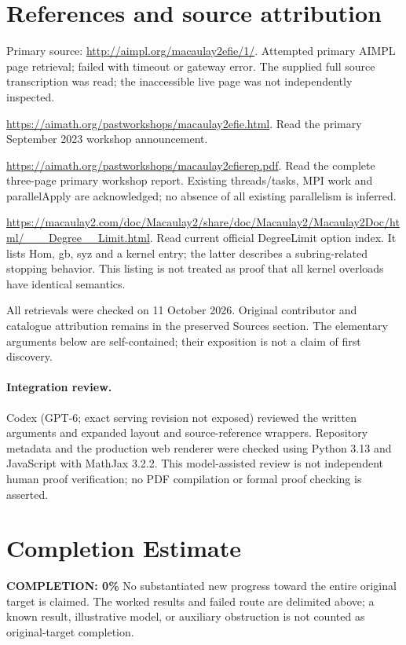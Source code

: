 \documentclass[11pt]{article}
\begin{document}
\section{References and source attribution}
Primary source: \url{http://aimpl.org/macaulay2efie/1/}. Attempted primary AIMPL page retrieval; failed with timeout or gateway error. The supplied full source transcription was read; the inaccessible live page was not independently inspected.

\url{https://aimath.org/pastworkshops/macaulay2efie.html}. Read the primary September 2023 workshop announcement.

\url{https://aimath.org/pastworkshops/macaulay2efierep.pdf}. Read the complete three-page primary workshop report. Existing threads/tasks, MPI work and parallelApply are acknowledged; no absence of all existing parallelism is inferred.

\url{https://macaulay2.com/doc/Macaulay2/share/doc/Macaulay2/Macaulay2Doc/html/___Degree__Limit.html}. Read current official DegreeLimit option index. It lists Hom, gb, syz and a kernel entry; the latter describes a subring-related stopping behavior. This listing is not treated as proof that all kernel overloads have identical semantics.

All retrievals were checked on 11 October 2026. Original contributor and catalogue attribution remains in the preserved Sources section. The elementary arguments below are self-contained; their exposition is not a claim of first discovery.


\paragraph{Integration review.} Codex (GPT-6; exact serving revision not exposed) reviewed the written arguments and expanded layout and source-reference wrappers. Repository metadata and the production web renderer were checked using Python 3.13 and JavaScript with MathJax 3.2.2. This model-assisted review is not independent human proof verification; no PDF compilation or formal proof checking is asserted.

\section{Completion Estimate}
\noindent\textbf{COMPLETION: 0\%}
No substantiated new progress toward the entire original target is claimed. The worked results and failed route are delimited above; a known result, illustrative model, or auxiliary obstruction is not counted as original-target completion.
\end{document}
